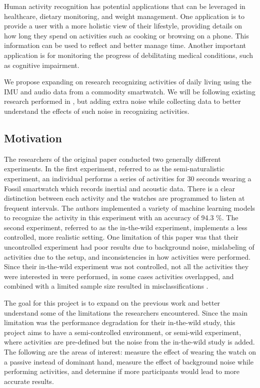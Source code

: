 \documentclass[conference]{IEEEtran}
\begin{document}
	Human activity recognition has potential applications that can be leveraged in healthcare, dietary monitoring, and weight management.
	One application is to provide a user with a more holistic view of their lifestyle, providing details on how long they spend on activities such as cooking or browsing on a phone. This information can be used to reflect and better manage time.
	Another important application is for monitoring the progress of debilitating medical conditions, such as cognitive impairment.
	
	We propose expanding on research recognizing activities of daily living using the IMU and audio data from a commodity smartwatch. 
	We will be following existing research performed in \cite{2022_Leveraging_sound}, but adding extra noise while collecting data to better understand the effects of such noise in recognizing activities.
	
	\subsection{Motivation}
	The researchers of the original paper conducted two generally different experiments. In the first experiment, referred to as the semi-naturalistic experiment, an individual performs a series of activities for 30 seconds wearing a Fossil smartwatch which records inertial and acoustic data. There is a clear distinction between each activity and the watches are programmed to listen at frequent intervals. The authors implemented a variety of machine learning models to recognize the activity in this experiment with an accuracy of 94.3 \%. The second experiment, referred to as the in-the-wild experiment, implements a less controlled, more realistic setting.
	One limitation of this paper was that their uncontrolled experiment had poor results due to background noise, mislabeling of activities due to the setup, and inconsistencies in how activities were performed.
	Since their in-the-wild experiment was not controlled, not all the activities they were interested in were performed, in some cases activities overlapped, and combined with a limited sample size resulted in misclassifications \cite{2022_Misclassifications}.
	
	The goal for this project is to expand on the previous work and better understand some of the limitations the researchers encountered.
	Since the main limitation was the performance degradation for their in-the-wild study, this project aims to have a semi-controlled environment, or semi-wild experiment, where activities are pre-defined but the noise from the in-the-wild study is added. 
	The following are the areas of interest: measure the effect of wearing the watch on a passive instead of dominant hand, measure the effect of background noise while performing activities, and determine if more participants would lead to more accurate results.
	
\end{document}
